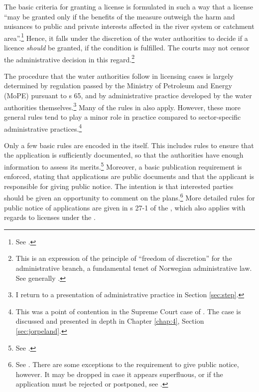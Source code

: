 The basic criteria for granting a license is formulated in such a way that a license ``may be granted only if the benefits of the measure outweigh the harm and nuisances to public and private interests affected in the river system or catchment area''.\footnote{See \cite[25]{wra00}.} Hence, it falls under the discretion of the water authorities to decide if a licence {\it should} be granted, if the condition is fulfilled. The courts may not censor the administrative decision in this regard.\footnote{This is an expression of the principle of ``freedom of discretion'' for the administrative branch, a fundamental tenet of Norwegian administrative law. See generally \cite[71-74]{eckhoff14}.}

The procedure that the water authorities follow in licensing cases is largely determined by regulation passed by the Ministry of Petroleum and Energy (MoPE) pursuant to s 65, and by administrative practice developed by the water authorities themselves.\footnote{I return to a presentation of administrative practice in Section \ref{sec:step}.} Many of the rules in \cite{ac67} also apply. However, these more general rules tend to play a minor role in practice compared to sector-specific administrative practices.\footnote{This was a point of contention in the Supreme Court case of \cite{jorpeland11}. The case is discussed and presented in depth in Chapter \ref{chap:4}, Section \ref{sec:jorpeland}.}

Only a few basic rules are encoded in the \cite{wra00} itself. This includes rules to ensure that the application is sufficiently documented, so that the authorities have enough information to assess its merits.\footnote{See \cite[23]{wra00}.} Moreover, a basic publication requirement is enforced, stating that applications are public documents and that the applicant is responsible for giving public notice. The intention is that interested parties should be given an opportunity to comment on the plans.\footnote{See \cite[24]{wra00}. There are some exceptions to the requirement to give public notice, however. It may be dropped in case it appears superfluous, or if the application must be rejected or postponed, see \cite[24a-24c]{wra00}.} More detailed rules for public notice of applications are given in s 27-1 of the \cite{pb08}, which also applies with regards to licenses under the \cite[8]{wra00}.

